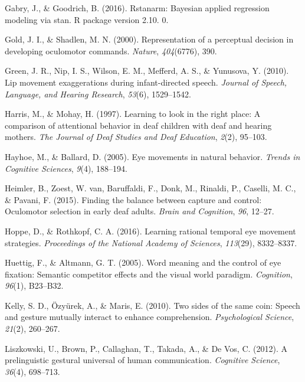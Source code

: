 \documentclass[english,floatsintext,man]{apa6}
\begin{document}
\leavevmode\hypertarget{ref-gabry2016rstanarm}{}%
Gabry, J., \& Goodrich, B. (2016). Rstanarm: Bayesian applied regression
modeling via stan. R package version 2.10. 0.

\leavevmode\hypertarget{ref-gold2000representation}{}%
Gold, J. I., \& Shadlen, M. N. (2000). Representation of a perceptual
decision in developing oculomotor commands. \emph{Nature},
\emph{404}(6776), 390.

\leavevmode\hypertarget{ref-green2010lip}{}%
Green, J. R., Nip, I. S., Wilson, E. M., Mefferd, A. S., \& Yunusova, Y.
(2010). Lip movement exaggerations during infant-directed speech.
\emph{Journal of Speech, Language, and Hearing Research}, \emph{53}(6),
1529--1542.

\leavevmode\hypertarget{ref-harris1997learning}{}%
Harris, M., \& Mohay, H. (1997). Learning to look in the right place: A
comparison of attentional behavior in deaf children with deaf and
hearing mothers. \emph{The Journal of Deaf Studies and Deaf Education},
\emph{2}(2), 95--103.

\leavevmode\hypertarget{ref-hayhoe2005eye}{}%
Hayhoe, M., \& Ballard, D. (2005). Eye movements in natural behavior.
\emph{Trends in Cognitive Sciences}, \emph{9}(4), 188--194.

\leavevmode\hypertarget{ref-heimler2015finding}{}%
Heimler, B., Zoest, W. van, Baruffaldi, F., Donk, M., Rinaldi, P.,
Caselli, M. C., \& Pavani, F. (2015). Finding the balance between
capture and control: Oculomotor selection in early deaf adults.
\emph{Brain and Cognition}, \emph{96}, 12--27.

\leavevmode\hypertarget{ref-hoppe2016learning}{}%
Hoppe, D., \& Rothkopf, C. A. (2016). Learning rational temporal eye
movement strategies. \emph{Proceedings of the National Academy of
Sciences}, \emph{113}(29), 8332--8337.

\leavevmode\hypertarget{ref-huettig2005word}{}%
Huettig, F., \& Altmann, G. T. (2005). Word meaning and the control of
eye fixation: Semantic competitor effects and the visual world paradigm.
\emph{Cognition}, \emph{96}(1), B23--B32.

\leavevmode\hypertarget{ref-kelly2010two}{}%
Kelly, S. D., Özyürek, A., \& Maris, E. (2010). Two sides of the same
coin: Speech and gesture mutually interact to enhance comprehension.
\emph{Psychological Science}, \emph{21}(2), 260--267.

\leavevmode\hypertarget{ref-liszkowski2012prelinguistic}{}%
Liszkowski, U., Brown, P., Callaghan, T., Takada, A., \& De Vos, C.
(2012). A prelinguistic gestural universal of human communication.
\emph{Cognitive Science}, \emph{36}(4), 698--713.
\end{document}
